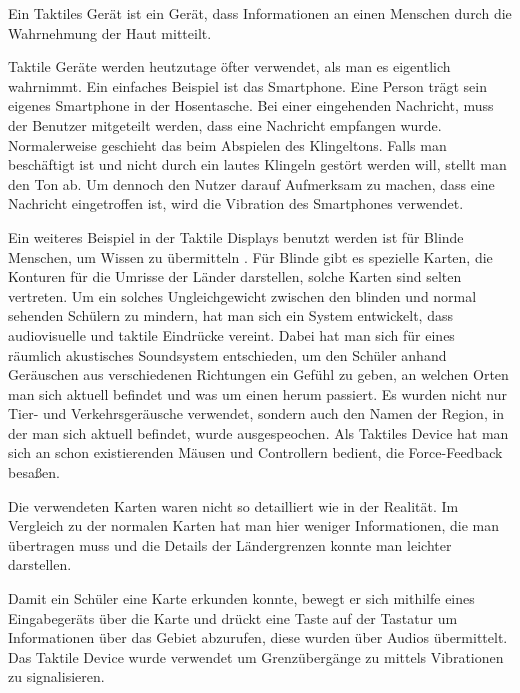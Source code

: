 
Ein Taktiles Ger{\"a}t ist ein Ger{\"a}t, dass Informationen an einen Menschen durch die Wahrnehmung der Haut mitteilt.\cite{gemperle2001design}

Taktile Ger{\"a}te werden heutzutage {\"o}fter verwendet, als man es eigentlich wahrnimmt. 
Ein einfaches Beispiel ist das Smartphone. 
Eine Person tr{\"a}gt sein eigenes Smartphone in der Hosentasche. 
Bei einer eingehenden Nachricht, muss der Benutzer mitgeteilt werden, dass eine Nachricht empfangen wurde.
Normalerweise geschieht das beim Abspielen des Klingeltons. Falls man besch{\"a}ftigt ist und nicht durch ein lautes Klingeln gest{\"o}rt werden will, stellt man den Ton ab. 
Um dennoch den Nutzer darauf Aufmerksam zu machen, dass eine Nachricht eingetroffen ist, wird die Vibration des Smartphones verwendet.

Ein weiteres Beispiel in der Taktile Displays benutzt werden ist f{\"u}r Blinde Menschen, um Wissen zu {\"u}bermitteln \cite{parente2003bats}. 
F{\"u}r Blinde gibt es spezielle Karten, die Konturen f{\"u}r die Umrisse der L{\"a}nder darstellen, solche Karten sind selten vertreten.
Um ein solches Ungleichgewicht zwischen den blinden und normal sehenden Sch{\"u}lern zu mindern, hat man sich ein System entwickelt, dass audiovisuelle und taktile Eindr{\"u}cke vereint. 
Dabei hat man sich f{\"u}r eines r{\"a}umlich akustisches Soundsystem entschieden, um den Sch{\"u}ler anhand Ger{\"a}uschen aus verschiedenen Richtungen ein Gef{\"u}hl zu geben, an welchen Orten man sich aktuell befindet und was um einen herum passiert. 
Es wurden nicht nur Tier- und Verkehrsger{\"a}usche verwendet, sondern auch den Namen der Region, in der man sich aktuell befindet, wurde ausgespeochen. 
Als Taktiles Device hat man sich an schon existierenden M{\"a}usen und Controllern bedient, die Force-Feedback besa{\ss}en. 

Die verwendeten Karten waren nicht so detailliert wie in der Realit{\"a}t.
Im Vergleich zu der normalen Karten hat man hier weniger Informationen, die man {\"u}bertragen muss und die Details der L{\"a}ndergrenzen konnte man leichter darstellen. 

Damit ein Sch{\"u}ler eine Karte erkunden konnte, bewegt er sich mithilfe eines Eingabeger{\"a}ts {\"u}ber die Karte und dr{\"u}ckt eine Taste auf der Tastatur um Informationen {\"u}ber das Gebiet abzurufen, diese wurden {\"u}ber Audios {\"u}bermittelt. Das Taktile Device wurde verwendet um Grenz{\"u}berg{\"a}nge zu mittels Vibrationen zu signalisieren.


